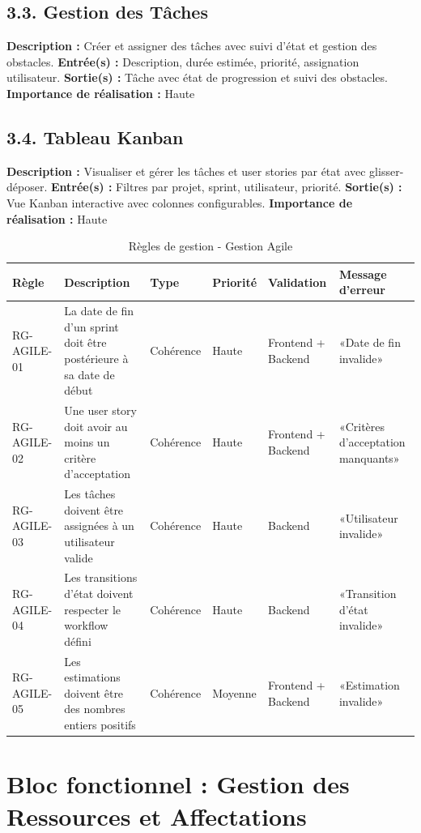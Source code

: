 \subsection{3.3. Gestion des Tâches}
\textbf{Description :} Créer et assigner des tâches avec suivi d'état et gestion des obstacles.
\textbf{Entrée(s) :} Description, durée estimée, priorité, assignation utilisateur.
\textbf{Sortie(s) :} Tâche avec état de progression et suivi des obstacles.
\textbf{Importance de réalisation :} Haute

\subsection{3.4. Tableau Kanban}
\textbf{Description :} Visualiser et gérer les tâches et user stories par état avec glisser-déposer.
\textbf{Entrée(s) :} Filtres par projet, sprint, utilisateur, priorité.
\textbf{Sortie(s) :} Vue Kanban interactive avec colonnes configurables.
\textbf{Importance de réalisation :} Haute

\begin{table}[H]
\centering
\footnotesize
\begin{tabular}{|p{1.5cm}|p{3.5cm}|p{1.5cm}|p{1.5cm}|p{2cm}|p{2.5cm}|}
\hline
\textbf{Règle} & \textbf{Description} & \textbf{Type} & \textbf{Priorité} & \textbf{Validation} & \textbf{Message d'erreur} \\
\hline
RG-AGILE-01 & La date de fin d'un sprint doit être postérieure à sa date de début & Cohérence & Haute & Frontend + Backend & «Date de fin invalide» \\
\hline
RG-AGILE-02 & Une user story doit avoir au moins un critère d'acceptation & Cohérence & Haute & Frontend + Backend & «Critères d'acceptation manquants» \\
\hline
RG-AGILE-03 & Les tâches doivent être assignées à un utilisateur valide & Cohérence & Haute & Backend & «Utilisateur invalide» \\
\hline
RG-AGILE-04 & Les transitions d'état doivent respecter le workflow défini & Cohérence & Haute & Backend & «Transition d'état invalide» \\
\hline
RG-AGILE-05 & Les estimations doivent être des nombres entiers positifs & Cohérence & Moyenne & Frontend + Backend & «Estimation invalide» \\
\hline
\end{tabular}
\caption{Règles de gestion - Gestion Agile}
\label{tab:rg_agile}
\end{table}

\section{Bloc fonctionnel : Gestion des Ressources et Affectations}

